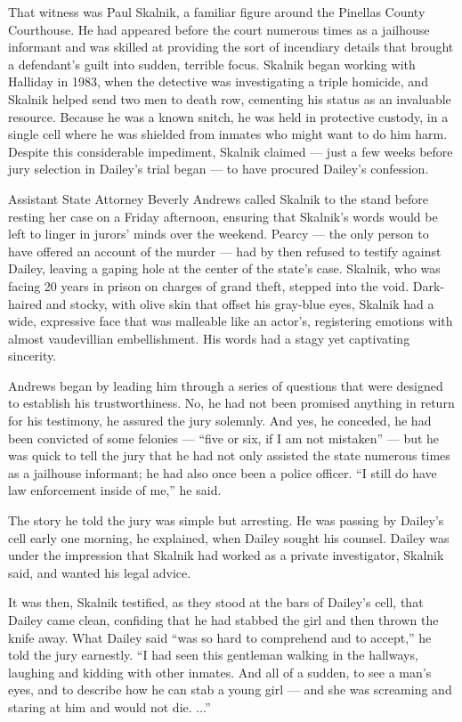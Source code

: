 That witness was Paul Skalnik, a familiar figure around the Pinellas
County Courthouse. He had appeared before the court numerous times as a
jailhouse informant and was skilled at providing the sort of incendiary
details that brought a defendant's guilt into sudden, terrible focus.
Skalnik began working with Halliday in 1983, when the detective was
investigating a triple homicide, and Skalnik helped send two men to
death row, cementing his status as an invaluable resource. Because he
was a known snitch, he was held in protective custody, in a single cell
where he was shielded from inmates who might want to do him harm.
Despite this considerable impediment, Skalnik claimed --- just a few
weeks before jury selection in Dailey's trial began --- to have procured
Dailey's confession.

Assistant State Attorney Beverly Andrews called Skalnik to the stand
before resting her case on a Friday afternoon, ensuring that Skalnik's
words would be left to linger in jurors' minds over the weekend. Pearcy
--- the only person to have offered an account of the murder --- had by
then refused to testify against Dailey, leaving a gaping hole at the
center of the state's case. Skalnik, who was facing 20 years in prison
on charges of grand theft, stepped into the void. Dark-haired and
stocky, with olive skin that offset his gray-blue eyes, Skalnik had a
wide, expressive face that was malleable like an actor's, registering
emotions with almost vaudevillian embellishment. His words had a stagy
yet captivating sincerity.

Andrews began by leading him through a series of questions that were
designed to establish his trustworthiness. No, he had not been promised
anything in return for his testimony, he assured the jury solemnly. And
yes, he conceded, he had been convicted of some felonies --- ``five or
six, if I am not mistaken'' --- but he was quick to tell the jury that
he had not only assisted the state numerous times as a jailhouse
informant; he had also once been a police officer. ``I still do have law
enforcement inside of me,'' he said.

The story he told the jury was simple but arresting. He was passing by
Dailey's cell early one morning, he explained, when Dailey sought his
counsel. Dailey was under the impression that Skalnik had worked as a
private investigator, Skalnik said, and wanted his legal advice.

It was then, Skalnik testified, as they stood at the bars of Dailey's
cell, that Dailey came clean, confiding that he had stabbed the girl and
then thrown the knife away. What Dailey said ``was so hard to comprehend
and to accept,'' he told the jury earnestly. ``I had seen this gentleman
walking in the hallways, laughing and kidding with other inmates. And
all of a sudden, to see a man's eyes, and to describe how he can stab a
young girl --- and she was screaming and staring at him and would not
die. ...''

